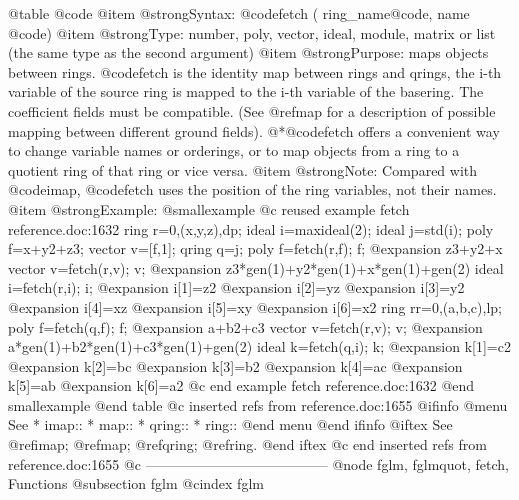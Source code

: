 @table @code
@item @strong{Syntax:}
@code{fetch (} ring_name@code{,} name @code{)}
@item @strong{Type:}
number, poly, vector, ideal, module, matrix or list
(the same type as the second argument)
@item @strong{Purpose:}
maps objects between rings.
@code{fetch} is the identity map between rings and qrings,
the i-th variable of the source ring is mapped to the i-th
variable of the basering.  The coefficient fields must be compatible.
(See @ref{map} for a description of possible mapping between
different ground fields).
@*@code{fetch} offers a convenient way to change
variable names or orderings, or to map objects from a ring to a quotient
ring of that ring or vice versa.
@item @strong{Note:}
Compared with @code{imap}, @code{fetch} uses the position of the ring
variables, not their names.
@item @strong{Example:}
@smallexample
@c reused example fetch reference.doc:1632 
  ring r=0,(x,y,z),dp;
  ideal i=maxideal(2);
  ideal j=std(i);
  poly f=x+y2+z3;
  vector v=[f,1];
  qring q=j;
  poly f=fetch(r,f);
  f;
@expansion{} z3+y2+x
  vector v=fetch(r,v);
  v;
@expansion{} z3*gen(1)+y2*gen(1)+x*gen(1)+gen(2)
  ideal i=fetch(r,i);
  i;
@expansion{} i[1]=z2
@expansion{} i[2]=yz
@expansion{} i[3]=y2
@expansion{} i[4]=xz
@expansion{} i[5]=xy
@expansion{} i[6]=x2
  ring rr=0,(a,b,c),lp;
  poly f=fetch(q,f);
  f;
@expansion{} a+b2+c3
  vector v=fetch(r,v);
  v;
@expansion{} a*gen(1)+b2*gen(1)+c3*gen(1)+gen(2)
  ideal k=fetch(q,i);
  k;
@expansion{} k[1]=c2
@expansion{} k[2]=bc
@expansion{} k[3]=b2
@expansion{} k[4]=ac
@expansion{} k[5]=ab
@expansion{} k[6]=a2
@c end example fetch reference.doc:1632
@end smallexample
@end table
@c inserted refs from reference.doc:1655
@ifinfo
@menu
See
* imap::
* map::
* qring::
* ring::
@end menu
@end ifinfo
@iftex
See
@ref{imap};
@ref{map};
@ref{qring};
@ref{ring}.
@end iftex
@c end inserted refs from reference.doc:1655
@c ---------------------------------------
@node fglm, fglmquot, fetch, Functions
@subsection fglm
@cindex fglm

